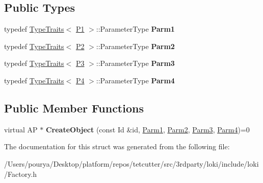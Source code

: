 \subsection*{Public Types}
\begin{DoxyCompactItemize}
\item 
\hypertarget{structLoki_1_1FactoryImpl_3_01AP_00_01Id_00_01LOKI__TYPELIST__4_07P1_00_01P2_00_01P3_00_01P4_08_4_a44449d7b0be26c7a7bb4b69b52f44058}{}typedef \hyperlink{classLoki_1_1TypeTraits}{Type\+Traits}$<$ \hyperlink{structP1}{P1} $>$\+::Parameter\+Type {\bfseries Parm1}\label{structLoki_1_1FactoryImpl_3_01AP_00_01Id_00_01LOKI__TYPELIST__4_07P1_00_01P2_00_01P3_00_01P4_08_4_a44449d7b0be26c7a7bb4b69b52f44058}

\item 
\hypertarget{structLoki_1_1FactoryImpl_3_01AP_00_01Id_00_01LOKI__TYPELIST__4_07P1_00_01P2_00_01P3_00_01P4_08_4_a1e57a75e81b6bc27f2ef6e51c40afb31}{}typedef \hyperlink{classLoki_1_1TypeTraits}{Type\+Traits}$<$ \hyperlink{structP2}{P2} $>$\+::Parameter\+Type {\bfseries Parm2}\label{structLoki_1_1FactoryImpl_3_01AP_00_01Id_00_01LOKI__TYPELIST__4_07P1_00_01P2_00_01P3_00_01P4_08_4_a1e57a75e81b6bc27f2ef6e51c40afb31}

\item 
\hypertarget{structLoki_1_1FactoryImpl_3_01AP_00_01Id_00_01LOKI__TYPELIST__4_07P1_00_01P2_00_01P3_00_01P4_08_4_a24e936b7b750b74bae1d148f3e447e6f}{}typedef \hyperlink{classLoki_1_1TypeTraits}{Type\+Traits}$<$ \hyperlink{structP3}{P3} $>$\+::Parameter\+Type {\bfseries Parm3}\label{structLoki_1_1FactoryImpl_3_01AP_00_01Id_00_01LOKI__TYPELIST__4_07P1_00_01P2_00_01P3_00_01P4_08_4_a24e936b7b750b74bae1d148f3e447e6f}

\item 
\hypertarget{structLoki_1_1FactoryImpl_3_01AP_00_01Id_00_01LOKI__TYPELIST__4_07P1_00_01P2_00_01P3_00_01P4_08_4_a4ee9f6f6d73eeddc1f67aba1041f5d32}{}typedef \hyperlink{classLoki_1_1TypeTraits}{Type\+Traits}$<$ \hyperlink{structP4}{P4} $>$\+::Parameter\+Type {\bfseries Parm4}\label{structLoki_1_1FactoryImpl_3_01AP_00_01Id_00_01LOKI__TYPELIST__4_07P1_00_01P2_00_01P3_00_01P4_08_4_a4ee9f6f6d73eeddc1f67aba1041f5d32}

\end{DoxyCompactItemize}
\subsection*{Public Member Functions}
\begin{DoxyCompactItemize}
\item 
\hypertarget{structLoki_1_1FactoryImpl_3_01AP_00_01Id_00_01LOKI__TYPELIST__4_07P1_00_01P2_00_01P3_00_01P4_08_4_adc19edfc637edd4e6064f18d13c37a36}{}virtual A\+P $\ast$ {\bfseries Create\+Object} (const Id \&id, \hyperlink{classLoki_1_1EmptyType}{Parm1}, \hyperlink{classLoki_1_1EmptyType}{Parm2}, \hyperlink{classLoki_1_1EmptyType}{Parm3}, \hyperlink{classLoki_1_1EmptyType}{Parm4})=0\label{structLoki_1_1FactoryImpl_3_01AP_00_01Id_00_01LOKI__TYPELIST__4_07P1_00_01P2_00_01P3_00_01P4_08_4_adc19edfc637edd4e6064f18d13c37a36}

\end{DoxyCompactItemize}


The documentation for this struct was generated from the following file\+:\begin{DoxyCompactItemize}
\item 
/\+Users/pourya/\+Desktop/platform/repos/tetcutter/src/3rdparty/loki/include/loki/Factory.\+h\end{DoxyCompactItemize}
